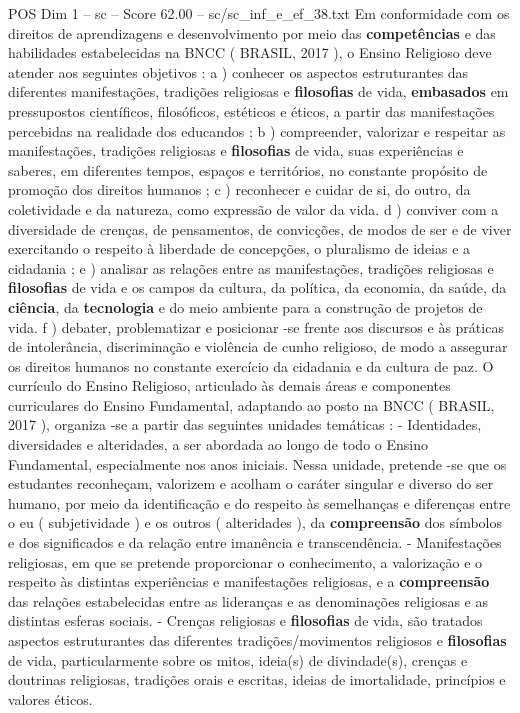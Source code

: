 \begin{textsample}{POS Dim 1 – sc – Score 62.00 – sc/sc\_inf\_e\_ef\_38.txt}
Em conformidade com os direitos de aprendizagens e desenvolvimento por meio das \textbf{competências} e das habilidades estabelecidas na BNCC ( BRASIL, 2017 ), o Ensino Religioso deve atender aos seguintes objetivos : a ) conhecer os aspectos estruturantes das diferentes manifestações, tradições religiosas e \textbf{filosofias} de vida, \textbf{embasados} em pressupostos científicos, filosóficos, estéticos e éticos, a partir das manifestações percebidas na realidade dos educandos ; b ) compreender, valorizar e respeitar as manifestações, tradições religiosas e \textbf{filosofias} de vida, suas experiências e saberes, em diferentes tempos, espaços e territórios, no constante propósito de promoção dos direitos humanos ; c ) reconhecer e cuidar de si, do outro, da coletividade e da natureza, como expressão de valor da vida. d ) conviver com a diversidade de crenças, de pensamentos, de convicções, de modos de ser e de viver exercitando o respeito à liberdade de concepções, o pluralismo de ideias e a cidadania ; e ) analisar as relações entre as manifestações, tradições religiosas e \textbf{filosofias} de vida e os campos da cultura, da política, da economia, da saúde, da \textbf{ciência}, da \textbf{tecnologia} e do meio ambiente para a construção de projetos de vida. f ) debater, problematizar e posicionar -se frente aos discursos e às práticas de intolerância, discriminação e violência de cunho religioso, de modo a assegurar os direitos humanos no constante exercício da cidadania e da cultura de paz.
O currículo do Ensino Religioso, articulado às demais áreas e componentes curriculares do Ensino Fundamental, adaptando ao posto na BNCC ( BRASIL, 2017 ), organiza -se a partir das seguintes unidades temáticas : - Identidades, diversidades e alteridades, a ser abordada ao longo de todo o Ensino Fundamental, especialmente nos anos iniciais.
Nessa unidade, pretende -se que os estudantes reconheçam, valorizem e acolham o caráter singular e diverso do ser humano, por meio da identificação e do respeito às semelhanças e diferenças entre o eu ( subjetividade ) e os outros ( alteridades ), da \textbf{compreensão} dos símbolos e dos significados e da relação entre imanência e transcendência. - Manifestações religiosas, em que se pretende proporcionar o conhecimento, a valorização e o respeito às distintas experiências e manifestações religiosas, e a \textbf{compreensão} das relações estabelecidas entre as lideranças e as denominações religiosas e as distintas esferas sociais. - Crenças religiosas e \textbf{filosofias} de vida, são tratados aspectos estruturantes das diferentes tradições/movimentos religiosos e \textbf{filosofias} de vida, particularmente sobre os mitos, ideia(s) de divindade(s), crenças e doutrinas religiosas, tradições orais e escritas, ideias de imortalidade, princípios e valores éticos.

\end{textsample}
